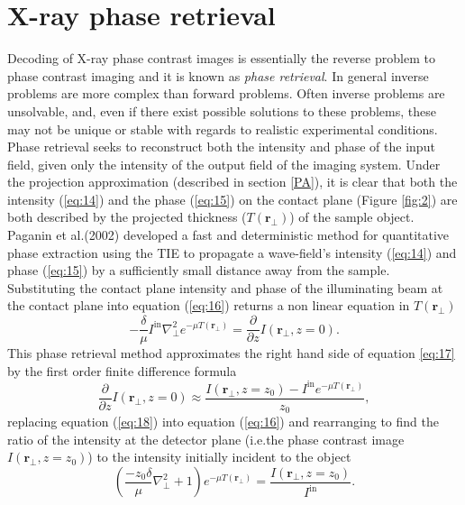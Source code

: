 \documentclass[10pt, a4paper, singlespacing]{report}
\begin{document}
\section{X-ray phase retrieval}\label{PR}
Decoding of X-ray phase contrast images is essentially the reverse problem to phase contrast imaging and it is known as \textit{phase retrieval}. 
In general inverse problems are more complex than forward problems. Often inverse problems are unsolvable, and, even if there exist possible solutions to these problems, these may not be unique or stable with regards to realistic experimental conditions. 
Phase retrieval seeks to reconstruct both the intensity and phase of the input field, given only the intensity of the output field of the imaging system\cite{PagsTutes}\cite{Pags2002}. Under the projection approximation (described in section \ref{PA}), it is clear that both the intensity (\ref{eq:14}) and the phase (\ref{eq:15}) on the contact plane (Figure \ref{fig:2}) are both described by the projected thickness ($T(\mathbf{r}_{\perp})$) of the sample object. Paganin et al.(2002) developed a fast and deterministic method for quantitative phase extraction\cite{Pags2002} using the TIE to propagate a wave-field's intensity (\ref{eq:14}) and phase (\ref{eq:15}) by a sufficiently small distance away from the sample.
Substituting the contact plane intensity and phase of the illuminating beam at the contact plane into equation (\ref{eq:16}) returns a non linear equation in $T(\mathbf{r}_{\perp})$
\begin{equation}\label{eq:17}
- \frac{\delta}{\mu} I^{\mathrm{in}} \nabla^{2}_{\perp} e^{-\mu T(\mathbf{r}_{\perp})} = \frac{\partial}{\partial z}I(\mathbf{r}_{\perp}, z=0).
\end{equation}
This phase retrieval method\cite{Pags2002} approximates the right hand side of equation \ref{eq:17} by the first order finite difference formula
\begin{equation}\label{eq:18}
\frac{\partial}{\partial z}I(\mathbf{r}_{\perp}, z=0) \approx \frac{I(\mathbf{r}_{\perp}, z=z_0) - I^{\mathrm{in}} e^{-\mu T(\mathbf{r}_{\perp})}}{z_0},
\end{equation}
replacing equation (\ref{eq:18}) into equation (\ref{eq:16}) and rearranging to find the ratio of the intensity at the detector plane (i.e.the phase contrast image $I(\mathbf{r}_{\perp}, z = z_0)$) to the intensity initially incident to the object
 \begin{equation}\label{eq:19}
\left (\frac{- z_0 \delta}{\mu}\nabla^{2}_{\perp} + 1 \right )e^{-\mu T(\mathbf{r}_{\perp})} = \frac{I(\mathbf{r}_{\perp}, z=z_0)}{I^{\mathrm{in}}}.
\end{equation}
\end{document}
